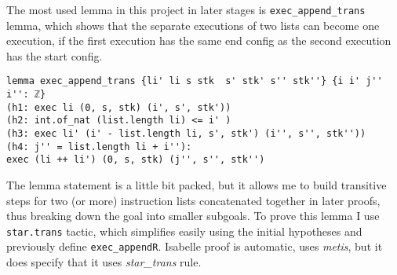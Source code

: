 The most used lemma in this project in later stages is \lstinline{exec_append_trans} lemma, which shows that the separate executions of two lists can become one execution, if the first execution has the same end config as the second execution has the start config.
\begin{lstlisting}
lemma exec_append_trans {li' li s stk  s' stk' s'' stk''} {i i' j'' i'': ℤ}
(h1: exec li (0, s, stk) (i', s', stk'))
(h2: int.of_nat (list.length li) <= i' )
(h3: exec li' (i' - list.length li, s', stk') (i'', s'', stk''))
(h4: j'' = list.length li + i''): 
exec (li ++ li') (0, s, stk) (j'', s'', stk'')
\end{lstlisting}
The lemma statement is a little bit packed, but it allows me to build transitive steps for two (or more) instruction lists concatenated together in later proofs, thus breaking down the goal into smaller subgoals. To prove this lemma I use \lstinline{star.trans} tactic, which simplifies easily using the initial hypotheses and previously define \lstinline{exec_appendR}. Isabelle proof is automatic, uses \emph{metis}, but it does specify that it uses \emph{star\_trans} rule.